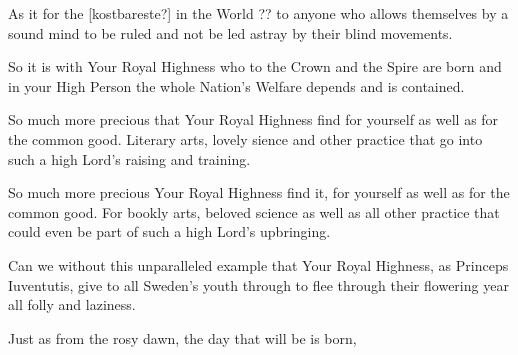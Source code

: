 
\newpage




As it for the [kostbareste?] in the World ?? to anyone who allows themselves by a
sound mind to be ruled and not be led astray by their blind
movements. 

So it is with Your Royal Highness who to the Crown and the
Spire are born and in your High Person the whole Nation's Welfare
depends and is contained. 

So much more precious that Your Royal
Highness find for yourself as well as for the common good. Literary
arts, lovely sience and other practice that go into such a high Lord's 
raising and training. 

So much more precious Your Royal Highness find
it,  for yourself as well as for the common good. For bookly arts,
beloved science as well as all other practice that could even be part of
such a high Lord's upbringing.

Can we without this unparalleled example that Your Royal Highness, as
Princeps Iuventutis, give to all Sweden's youth through to flee
through their flowering year all folly and laziness. 

Just as from the rosy dawn, the day that will be is born, 